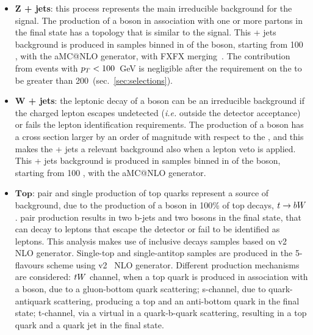 
\begin{itemize}
  \item {\bf $\mathbf{Z}$ + jets}: this process represents the main irreducible background for the signal. The production of a \Z boson in association with one or more partons in the final state has a topology that is similar to the signal. This \Z + jets background is produced in samples binned in \pt of the \Z boson, starting from 100 \GeV, with the {\sc aMC@NLO} generator, with FXFX merging~\cite{bib:FXFX}. The contribution from events with $p_T<100$~GeV is negligible after the requirement on the \met to be greater than 200~\GeV (sec.~\ref{sec:selections}).
  \item {\bf $\mathbf{W}$ + jets}: the leptonic decay of a \W boson can be an irreducible background if the charged lepton escapes undetected (\textit{i.e.} outside the detector acceptance) or fails the lepton identification requirements. The production of a \W boson has a cross section larger by an order of magnitude with respect to the \Z, and this makes the \W + jets a relevant background also when a lepton veto is applied. This \W + jets background is produced in samples binned in \pt of the \W boson, starting from 100 \GeV, with the {\sc aMC@NLO} generator.%
  \item $\mathbf{Top}$: pair and single production of top quarks represent a source of background, due to the production of a \W boson in 100\% of top decays, $t \rightarrow b W$. \ttbar pair production results in two b-jets and two \W bosons in the final state, that can decay to leptons that escape the detector or fail to be identified as leptons. This analysis makes use of \ttbar inclusive decays samples based on \POWHEG v2~\cite{bib:POWHEGst} NLO generator. Single-top and single-antitop samples are produced in the 5-flavours scheme using \POWHEG v2~\cite{bib:POWHEGtt} NLO generator. Different production mechanisms are considered: $t W$ channel, when a top quark is produced in association with a \W boson, due to a gluon-bottom quark scattering; s-channel, due to quark-antiquark scattering, producing a top and an anti-bottom quark in the final state; t-channel, via a virtual \W in a quark-b-quark scattering, resulting in a top quark and a quark jet in the final state.

\end{itemize}
